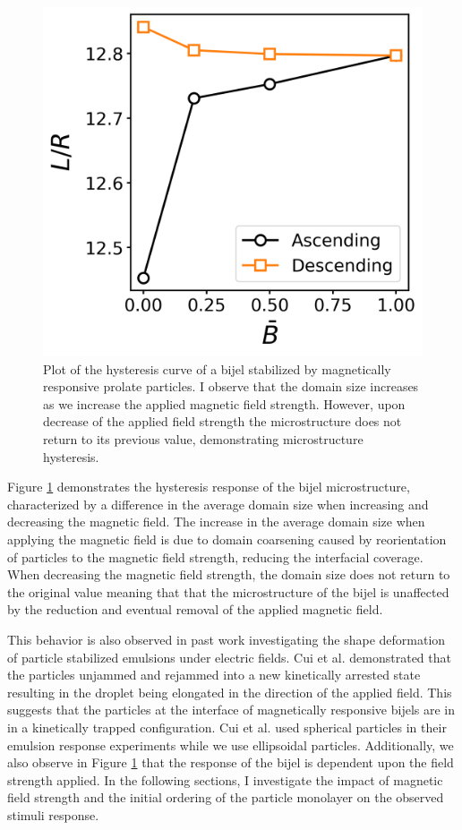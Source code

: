 \begin{figure} 
    \centering 
    \includegraphics[scale=0.5]{../figures/results/paper2/hysteresis_curve.png} 
    \caption{Plot of the hysteresis curve of a bijel stabilized by magnetically responsive prolate particles. I observe that the domain size increases as we 
    increase the applied magnetic field strength. However, upon decrease of the applied field strength the microstructure does not return to its previous value,
    demonstrating microstructure hysteresis.} 
    \label{fig:hysteresis_curve} 
\end{figure}

Figure \ref{fig:hysteresis_curve} demonstrates the hysteresis response of the bijel microstructure, characterized by a difference in the average domain size
when increasing and decreasing the magnetic field. The increase in the average domain size when applying the magnetic field is due to domain coarsening caused by 
reorientation of particles to the magnetic field strength, reducing the interfacial coverage. When decreasing the magnetic field strength, 
the domain size does not return to the original value meaning that that the microstructure of the bijel is unaffected by 
the reduction and eventual removal of the applied magnetic field. 

This behavior is also observed in past work investigating the shape deformation of particle stabilized emulsions under 
electric fields. \cite{cui_stabilizing_2013} Cui et al. demonstrated that the particles unjammed and rejammed into a new kinetically arrested state resulting in
the droplet being elongated in the direction of the applied field. This suggests that the particles at the interface of magnetically responsive bijels are in
in a kinetically trapped configuration. Cui et al. used spherical particles in their emulsion response experiments while we use ellipsoidal particles. Additionally,
we also observe in Figure \ref{fig:hysteresis_curve} that the response of the bijel is dependent upon the field strength applied.
In the following sections, I investigate the impact of magnetic field strength and the initial ordering of the particle monolayer on the observed stimuli response.

